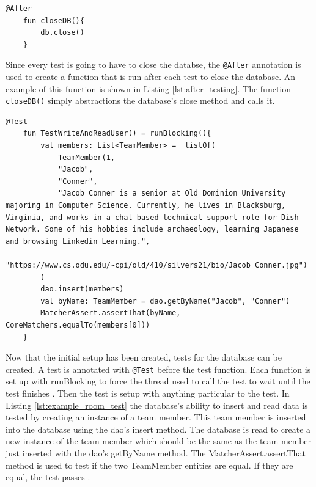 \documentclass[12pt]{article}
\begin{document}
   \begin{lstlisting}[numbers=none, 
			caption=Code to close the Database after the test,
			label={lst:after_testing}]
    @After
    fun closeDB(){
        db.close()
    }
\end{lstlisting}

Since every test is going to have to close the databse, the \verb|@After| annotation is used to create a function that is run after each test to close the database. An example of this function is shown in Listing \ref{lst:after_testing}. The function \verb|closeDB()| simply abstractions the database's close method and calls it. 

   \begin{lstlisting}[numbers=none, 
			caption=Example Test for Room Database,
			label={lst:example_room_test}]
    @Test
    fun TestWriteAndReadUser() = runBlocking(){
        val members: List<TeamMember> =  listOf(
            TeamMember(1,
            "Jacob",
            "Conner",
            "Jacob Conner is a senior at Old Dominion University majoring in Computer Science. Currently, he lives in Blacksburg, Virginia, and works in a chat-based technical support role for Dish Network. Some of his hobbies include archaeology, learning Japanese and browsing Linkedin Learning.",
            "https://www.cs.odu.edu/~cpi/old/410/silvers21/bio/Jacob_Conner.jpg")
        )
        dao.insert(members)
        val byName: TeamMember = dao.getByName("Jacob", "Conner")
        MatcherAssert.assertThat(byName, CoreMatchers.equalTo(members[0]))
    }
\end{lstlisting}

Now that the initial setup has been created, tests for the database can be created. A test is annotated with  \verb|@Test| before the test function.  Each function is set up with runBlocking to force the thread used to call the test to wait until the test finishes \cite{kotlinCoroutines}.  Then the test is setup with anything particular to the test. In Listing \ref{lst:example_room_test} the database's ability to insert and read data is tested by creating an instance of a team member. This team member is inserted into the database using the dao's insert method. The database is read to create a new instance of the team member which should be the same as the team member just inserted with the dao's getByName method. The MatcherAssert.assertThat method is used to test if the two TeamMember entities are equal. If they are equal, the test passes \cite{SimplifiedCodingRoomTesting}. 
\end{document}
